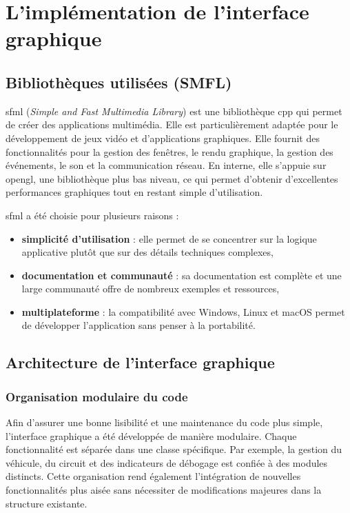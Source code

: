 \section{L'implémentation de l'interface graphique}\label{sec:l'implementation-de-l-interface-graphique}
\subsection{Bibliothèques utilisées (SMFL)}\label{subsec:sfml}
\gls{sfml} (\textit{Simple and Fast Multimedia Library}) est une bibliothèque \gls{cpp} qui permet de créer des applications multimédia.
Elle est particulièrement adaptée pour le développement de jeux vidéo et d'applications graphiques.
Elle fournit des fonctionnalités pour la gestion des fenêtres, le rendu graphique, la gestion des événements, le son et la communication réseau.
En interne, elle s'appuie sur \gls{opengl}, une bibliothèque plus bas niveau, ce qui permet d'obtenir d'excellentes performances graphiques tout en restant simple d'utilisation.

\gls{sfml} a été choisie pour plusieurs raisons :
\begin{itemize}
    \item \textbf{simplicité d'utilisation} : elle permet de se concentrer sur la logique applicative plutôt que sur des détails techniques complexes,
    \item \textbf{documentation et communauté} : sa documentation\cite{documentationSFML} est complète et une large communauté offre de nombreux exemples et ressources,
    \item \textbf{multiplateforme} : la compatibilité avec Windows, Linux et macOS permet de développer l'application sans penser à la portabilité.
\end{itemize}

\subsection{Architecture de l'interface graphique}\label{subsec:architecture-de-l-interface-graphique}
\subsubsection{Organisation modulaire du code}\label{subsubsec:organisation-modulaire-du-code}
Afin d'assurer une bonne lisibilité et une maintenance du code plus simple, l'interface graphique a été développée de manière modulaire.
Chaque fonctionnalité est séparée dans une classe spécifique.
Par exemple, la gestion du véhicule, du circuit et des indicateurs de débogage est confiée à des modules distincts.
Cette organisation rend également l'intégration de nouvelles fonctionnalités plus aisée sans nécessiter de modifications majeures dans la structure existante.

